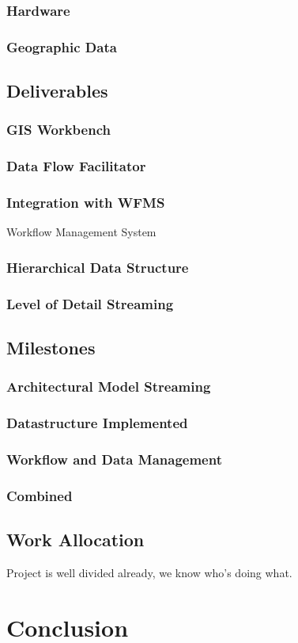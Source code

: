 \documentclass[12pt,a4paper]{article}
\begin{document}
\subsubsection*{Hardware}
\subsubsection*{Geographic Data}
\subsection{Deliverables}
\subsubsection{GIS Workbench}
\subsubsection{Data Flow Facilitator}
\subsubsection{Integration with WFMS}
Workflow Management System
\subsubsection{Hierarchical Data Structure}
\subsubsection{Level of Detail Streaming}
\subsection{Milestones}
\subsubsection{Architectural Model Streaming}
\subsubsection*{Datastructure Implemented}
\subsubsection{Workflow and Data Management}
\subsubsection{Combined}
\subsection{Work Allocation}
Project is well divided already, we know who's doing what.
\section{Conclusion}
\end{document}
